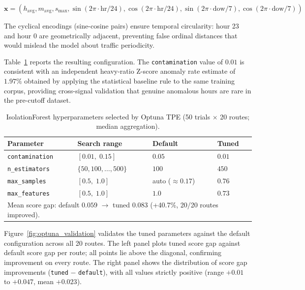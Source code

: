   \begin{equation}
  \label{eq:feature_vector}
  \mathbf{x} = (h_{\text{avg}}, m_{\text{avg}}, s_{\text{max}}, \sin(2\pi \cdot \text{hr}/24), \cos(2\pi \cdot \text{hr}/24), \sin(2\pi \cdot \text{dow}/7), \cos(2\pi \cdot \text{dow}/7))
  \end{equation}

  The cyclical encodings (sine-cosine pairs) ensure temporal circularity: hour 23 and hour 0 are geometrically adjacent, preventing false ordinal distances that would mislead the model about traffic periodicity.

  Table~\ref{tab:iforest_params} reports the resulting configuration.
  The \texttt{contamination} value of $0.01$ is consistent with an
  independent heavy-ratio Z-score anomaly rate estimate of $1.97\%$
  obtained by applying the statistical baseline rule to the same training
  corpus, providing cross-signal validation that
  genuine anomalous hours are rare in the pre-cutoff dataset.

  \begin{table}[htbp]
  \centering
  \caption{IsolationForest hyperparameters selected by Optuna TPE
           (50 trials $\times$ 20 routes; median aggregation).}
  \label{tab:iforest_params}
  \begin{tabular}{llll}
  \hline
  \textbf{Parameter} & \textbf{Search range} & \textbf{Default} & \textbf{Tuned} \\
  \hline
  \texttt{contamination} & $[0.01,\;0.15]$ & $0.05$ & $0.01$ \\
  \texttt{n\_estimators}  & $\{50,100,\ldots,500\}$ & $100$ & $450$ \\
  \texttt{max\_samples}   & $[0.5,\;1.0]$  & auto (${\approx}0.17$) & $0.76$ \\
  \texttt{max\_features}  & $[0.5,\;1.0]$  & $1.0$ & $0.73$ \\
  \hline
  \multicolumn{4}{l}{Mean score gap: default $0.059$ $\to$ tuned $0.083$
                     (+40.7\%, 20/20 routes improved).} \\
  \hline
  \end{tabular}
  \end{table}

  Figure~\ref{fig:optuna_validation} validates the tuned parameters against
  the default configuration across all 20 routes.
  The left panel plots tuned score gap against default score gap per route;
  all points lie above the diagonal, confirming improvement on every route.
  The right panel shows the distribution of score gap improvements
  (\texttt{tuned} $-$ \texttt{default}), with all values strictly positive
  (range $+0.01$ to $+0.047$, mean $+0.023$).

